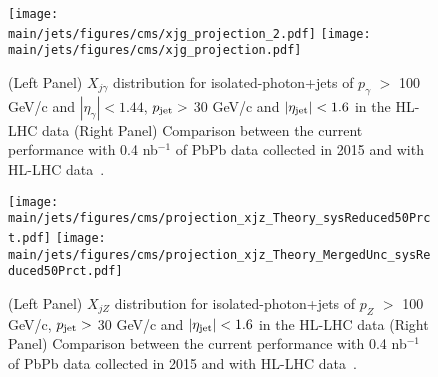 \begin{figure}[!ht]
\begin{center}
\texttt{[image: \\main/jets/figures/cms/xjg\_projection\_2.pdf]}
\texttt{[image: \\main/jets/figures/cms/xjg\_projection.pdf]}
\caption{(Left Panel) $X_{j\gamma}$ distribution for isolated-photon+jets of $p_{\gamma}$ $> $ 100 GeV/c and $|\eta_{\gamma}|<1.44$, $p_{\rm jet} > $ 30 GeV/c and $|\eta_{\rm jet}| < 1.6$ in the HL-LHC data (Right Panel) Comparison between the current performance with 0.4 nb$^{-1}$ of PbPb data collected in 2015 and with HL-LHC data~\cite{CMS-FTR-17-002:2017dec}.}
\label{fig:photonjet}
\end{center}
\end{figure}
%
\begin{figure}[!ht]
\begin{center}
\texttt{[image: \\main/jets/figures/cms/projection\_xjz\_Theory\_sysReduced50Prct.pdf]}
\texttt{[image: \\main/jets/figures/cms/projection\_xjz\_Theory\_MergedUnc\_sysReduced50Prct.pdf]}
\caption{(Left Panel) $X_{jZ}$ distribution for isolated-photon+jets of $p_{Z}$ $> $ 100 GeV/c, $p_{\rm jet} > $ 30 GeV/c and $|\eta_{\rm jet}| < 1.6$ in the HL-LHC data (Right Panel) Comparison between the current performance with 0.4 nb$^{-1}$ of PbPb data collected in 2015 and with HL-LHC data~\cite{CMS-FTR-17-002:2017dec}.}
\label{fig:Zjet}
\end{center}
\end{figure}
